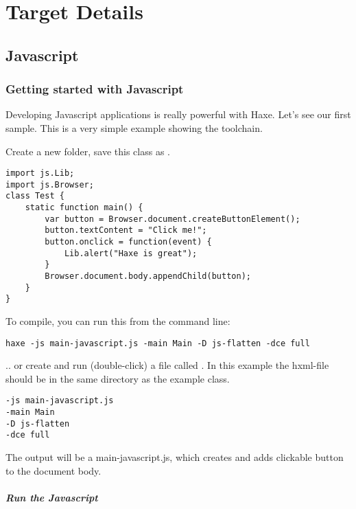 \chapter{Target Details}
\label{target-details}

\section{Javascript}
\label{target-javascript}

\subsection{Getting started with Javascript}
\label{target-javascript-getting-started}

Developing Javascript applications is really powerful with Haxe. Let's see our first sample.
This is a very simple example showing the toolchain. 

Create a new folder, save this class as .

\begin{lstlisting}
import js.Lib;
import js.Browser;
class Test {
    static function main() {
        var button = Browser.document.createButtonElement();
        button.textContent = "Click me!";
        button.onclick = function(event) {
            Lib.alert("Haxe is great");
        }
        Browser.document.body.appendChild(button);
    }
}
\end{lstlisting}

To compile, you can run this from the command line:

\begin{lstlisting}
haxe -js main-javascript.js -main Main -D js-flatten -dce full
\end{lstlisting}

.. or create and run (double-click) a file called . In this example the hxml-file should be in the same directory as the example class.

\begin{lstlisting}
-js main-javascript.js
-main Main
-D js-flatten
-dce full
\end{lstlisting}

The output will be a main-javascript.js, which creates and adds clickable button to the document body.

\paragraph{Run the Javascript}

